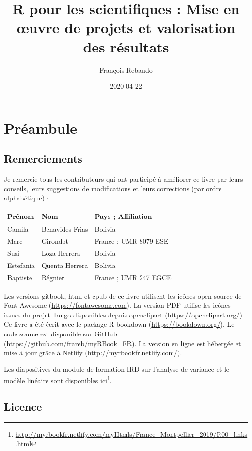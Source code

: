 \documentclass[
]{book}
\title{R pour les scientifiques : Mise en œuvre de projets et valorisation des résultats}
\author{François Rebaudo}
\date{2020-04-22}
\renewcommand{\href}[2]{#2\footnote{\url{#1}}}
\begin{document}
\maketitle

{
\setcounter{tocdepth}{1}
\tableofcontents
}
\hypertarget{pruxe9ambule}{%
\chapter{Préambule}\label{pruxe9ambule}}

\hypertarget{remerciements}{%
\section{Remerciements}\label{remerciements}}

Je remercie tous les contributeurs qui ont participé à améliorer ce livre par leurs conseils, leurs suggestions de modifications et leurs corrections (par ordre alphabétique) :

\begin{tabular}{l|l|l}
\hline
Prénom & Nom & Pays ; Affiliation\\
\hline
Camila & Benavides Frias & Bolivia\\
\hline
Marc & Girondot & France ; UMR 8079 ESE\\
\hline
Susi & Loza Herrera & Bolivia\\
\hline
Estefania & Quenta Herrera & Bolivia\\
\hline
Baptiste & Régnier & France ; UMR 247 EGCE\\
\hline
\end{tabular}

Les versions gitbook, html et epub de ce livre utilisent les icônes open source de Font Awesome (\url{https://fontawesome.com}). La version PDF utilise les icônes issues du projet Tango disponibles depuis openclipart (\url{https://openclipart.org/}). Ce livre a été écrit avec le package R bookdown (\url{https://bookdown.org/}). Le code source est disponible sur GitHub (\url{https://github.com/frareb/myRBook_FR}). La version en ligne est hébergée et mise à jour grâce à Netlify (\url{http://myrbookfr.netlify.com/}).

Les diapositives du \href{http://myrbookfr.netlify.com/myHtmls/France_Montpellier_2019/R00_links.html}{module de formation IRD sur l'analyse de variance et le modèle linéaire sont disponibles ici}.

\hypertarget{licence}{%
\section{Licence}\label{licence}}
\end{document}
